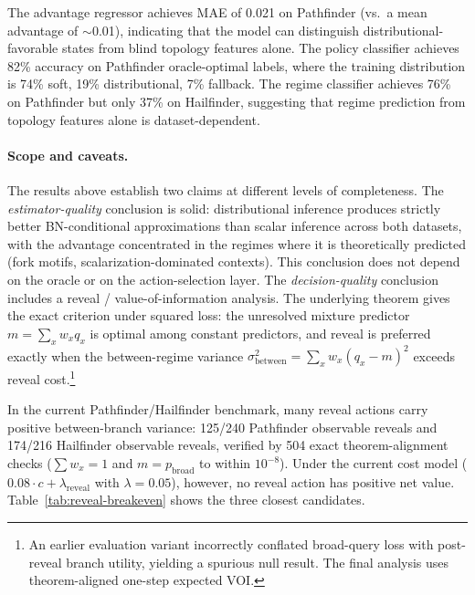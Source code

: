 \documentclass[11pt,openany]{report}
\begin{document}
The advantage regressor achieves MAE of 0.021 on Pathfinder (vs.\
a mean advantage of $\sim$0.01), indicating that the model can
distinguish distributional-favorable states from blind topology
features alone.  The policy classifier achieves 82\% accuracy on
Pathfinder oracle-optimal labels, where the training distribution is
74\% soft, 19\% distributional, 7\% fallback.
The regime classifier achieves 76\% on Pathfinder but only 37\% on
Hailfinder, suggesting that regime prediction from topology features
alone is dataset-dependent.

\paragraph{Scope and caveats.}
The results above establish two claims at different levels of completeness.
The \emph{estimator-quality} conclusion is solid: distributional inference
produces strictly better BN-conditional approximations than scalar inference
across both datasets, with the advantage concentrated in the regimes where
it is theoretically predicted (fork motifs, scalarization-dominated
contexts).  This conclusion does not depend on the oracle or on the
action-selection layer.
The \emph{decision-quality} conclusion includes a reveal /
value-of-information analysis.  The underlying theorem gives the exact
criterion under squared loss: the unresolved mixture predictor
$m = \sum_x w_x q_x$ is optimal among constant predictors, and reveal is
preferred exactly when the between-regime variance
$\sigma^2_{\mathrm{between}} = \sum_x w_x (q_x - m)^2$ exceeds reveal
cost.\footnote{An earlier evaluation variant incorrectly conflated
broad-query loss with post-reveal branch utility, yielding a spurious null
result.  The final analysis uses theorem-aligned one-step expected VOI.}

In the current Pathfinder/Hailfinder benchmark, many reveal actions carry
positive between-branch variance: 125/240 Pathfinder observable reveals
and 174/216 Hailfinder observable reveals, verified by 504 exact
theorem-alignment checks ($\sum w_x = 1$ and $m = p_{\mathrm{broad}}$
to within $10^{-8}$).  Under the current cost model
($0.08 \cdot c + \lambda_{\mathrm{reveal}}$ with $\lambda = 0.05$),
however, no reveal action has positive net value.
Table~\ref{tab:reveal-breakeven} shows the three closest candidates.
\end{document}
